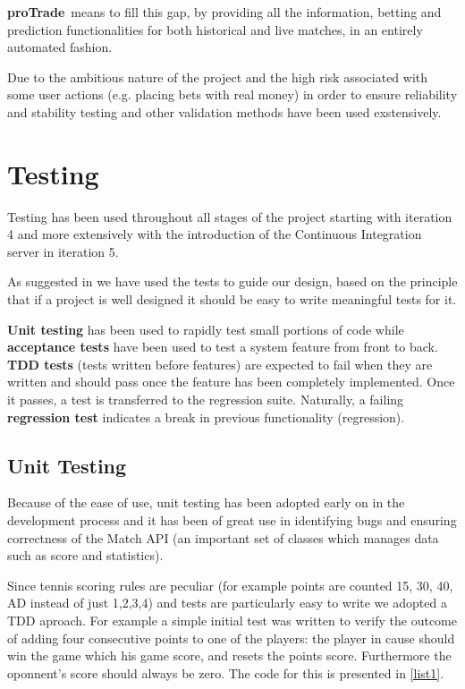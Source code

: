 \documentclass[10pt]{article}
\newcommand{\nm}{{\bf proTrade}}
\newcommand{\nmsp}{{\nm \ }}
\begin{document}
\nmsp means to fill this gap, by providing all the information, betting and prediction functionalities for both historical and live matches, in an entirely automated fashion.

Due to the ambitious nature of the project and the high risk associated with some user actions (e.g. placing bets with real money) in order to ensure reliability and stability testing and other validation methods have been used exstensively. 

\section{Testing}
Testing has been used throughout all stages of the project starting with iteration 4 and more extensively with the introduction of the Continuous Integration server in iteration 5.

As suggested in \cite{bk-testing} we have used the tests to guide our design, based on the principle that if a project is well designed it should be easy to write meaningful tests for it.

\textbf{Unit testing} has been used to rapidly test small portions of code while \textbf{acceptance tests} have been used to test a system feature from front to back. \textbf {TDD tests} (tests written before features) are expected to fail when they are written and should pass once the feature has been completely implemented. Once it passes, a test is transferred to the regression suite. Naturally, a failing \textbf{regression test} indicates a break in previous functionality (regression).


\subsection{Unit Testing}
Because of the ease of use, unit testing has been adopted early on in the development process and it has been of great use in identifying bugs and ensuring correctness of the Match API (an important set of classes which manages data such as score and statistics). 

Since tennis scoring rules are peculiar (for example points are counted 15, 30, 40, AD instead of just 1,2,3,4) and tests are particularly easy to write we adopted a TDD aproach. For example a simple initial test was written to verify the outcome of adding four consecutive points to one of the players: the player in cause should win the game which his game score, and resets the points score. Furthermore the oponnent's score should always be zero. The code for this is presented in \ref{list1}.
\end{document}
